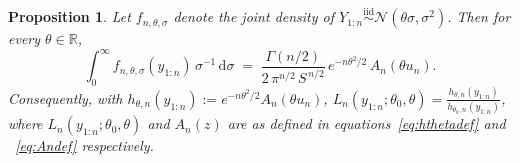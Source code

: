 \documentclass[12pt, a4paper]{report}
\newcommand{\E}{\mathbb{E}}
\newtheorem{proposition}[theorem]{Proposition}
\newcommand{\diff}{\mathrm{d}}
\newcommand{\1}{\mathbf{1}}
\begin{document}
\begin{proposition}
\label{prop:scale-invariant}
Let $f_{n,\theta,\sigma}$ denote the joint density of
$Y_{1:n}\stackrel{\mathrm{iid}}{\sim}\mathcal{N}(\theta\sigma,\sigma^{2})$.
Then for every $\theta\in\mathbb{R}$,
\begin{equation}
\label{eq:integratedlik}
\int_{0}^{\infty} f_{n,\theta,\sigma}(y_{1:n})\,\sigma^{-1}\,\diff\sigma
\;=\;
\frac{\Gamma(n/2)}{2\,\pi^{n/2}\,S^{\,n/2}}\,
e^{-n\theta^{2}/2}\, A_n(\theta u_n).
\end{equation}
Consequently, with $h_{\theta,n}(y_{1:n}):=e^{-n\theta^{2}/2}A_n(\theta u_n)$, $L_n(y_{1:n};\theta_0,\theta) = \frac{h_{\theta,n}(y_{1:n})}{h_{\theta_0,n}(y_{1:n})}$, 
where $L_n(y_{1:n};\theta_0,\theta)$ and $A_n(z)$ are as defined in equations~\eqref{eq:hthetadef} and ~\eqref{eq:Andef} respectively.
\end{proposition}
\end{document}
